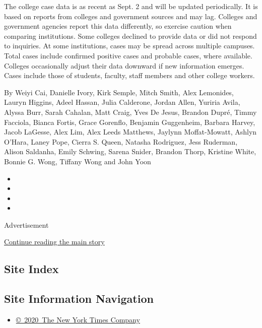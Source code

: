 The college case data is as recent as Sept. 2 and will be updated
periodically. It is based on reports from colleges and government
sources and may lag. Colleges and government agencies report this data
differently, so exercise caution when comparing institutions. Some
colleges declined to provide data or did not respond to inquiries. At
some institutions, cases may be spread across multiple campuses. Total
cases include confirmed positive cases and probable cases, where
available. Colleges occasionally adjust their data downward if new
information emerges. Cases include those of students, faculty, staff
members and other college workers.

By Weiyi Cai, Danielle Ivory, Kirk Semple, Mitch Smith, Alex Lemonides,
Lauryn Higgins, Adeel Hassan, Julia Calderone, Jordan Allen, Yuriria
Avila, Alyssa Burr, Sarah Cahalan, Matt Craig, Yves De Jesus, Brandon
Dupré, Timmy Facciola, Bianca Fortis, Grace Gorenflo, Benjamin
Guggenheim, Barbara Harvey, Jacob LaGesse, Alex Lim, Alex Leeds
Matthews, Jaylynn Moffat-Mowatt, Ashlyn O'Hara, Laney Pope, Cierra S.
Queen, Natasha Rodriguez, Jess Ruderman, Alison Saldanha, Emily Schwing,
Sarena Snider, Brandon Thorp, Kristine White, Bonnie G. Wong, Tiffany
Wong and John Yoon

\begin{itemize}
\item
\item
\item
\item
\end{itemize}

Advertisement

\protect\hyperlink{after-bottom}{Continue reading the main story}

\hypertarget{site-index}{%
\subsection{Site Index}\label{site-index}}

\hypertarget{site-information-navigation}{%
\subsection{Site Information
Navigation}\label{site-information-navigation}}

\begin{itemize}
\tightlist
\item
  \href{https://help.nytimes3xbfgragh.onion/hc/en-us/articles/115014792127-Copyright-notice}{©~2020~The
  New York Times Company}
\end{itemize}

